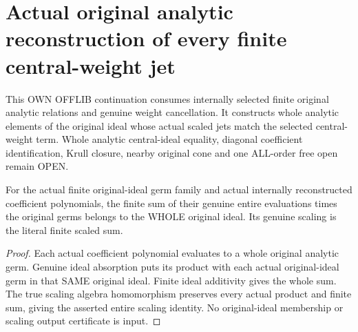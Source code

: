 \section{Actual original analytic reconstruction of every finite central-weight jet}
This OWN OFFLIB continuation consumes internally selected finite original analytic relations and genuine weight cancellation. It constructs whole analytic elements of the original ideal whose actual scaled jets match the selected central-weight term. Whole analytic central-ideal equality, diagonal coefficient identification, Krull closure, nearby original cone and one ALL-order free open remain OPEN.

\begin{lemma}
\label{hir:relative-normal-graph-weight-reconstruction-entire-original-ideal}
\leanok
For the actual finite original-ideal germ family and actual internally reconstructed coefficient polynomials, the finite sum of their genuine entire evaluations times the original germs belongs to the WHOLE original ideal. Its genuine scaling is the literal finite scaled sum.
\end{lemma}
\begin{proof}
Each actual coefficient polynomial evaluates to a whole original analytic germ. Genuine ideal absorption puts its product with each actual original-ideal germ in that SAME original ideal. Finite ideal additivity gives the whole sum. The true scaling algebra homomorphism preserves every actual product and finite sum, giving the asserted entire scaling identity. No original-ideal membership or scaling output certificate is input.
\end{proof}

